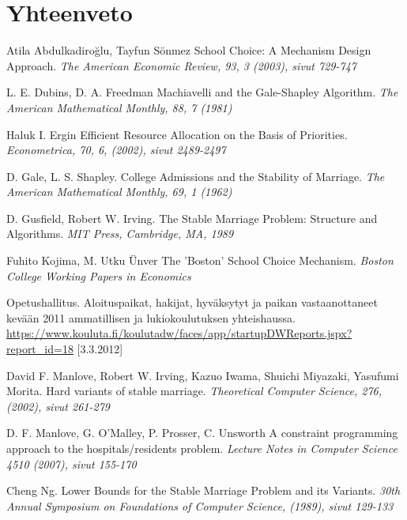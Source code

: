 \documentclass[gradu, twoside]{tktltiki}
\begin{document}
\section{Yhteenveto}

\newpage
\begin{thebibliography}{XXX99}

  Atila Abdulkadiroğlu, Tayfun Sönmez
  School Choice: A Mechanism Design Approach.
  \emph{The American Economic Review, 93, 3 (2003), sivut 729-747}

  L. E. Dubins, D. A. Freedman
  Machiavelli and the Gale-Shapley Algorithm.
  \emph{The American Mathematical Monthly, 88, 7 (1981)}

  Haluk I. Ergin
  Efficient Resource Allocation on the Basis of Priorities.
  \emph{Econometrica, 70, 6, (2002), sivut 2489-2497}

  D. Gale, L. S. Shapley.
  College Admissions and the Stability of Marriage.
  \emph{The American Mathematical Monthly, 69, 1 (1962)}

  D. Gusfield, Robert W. Irving.
  The Stable Marriage Problem: Structure and Algorithms.
  \emph{MIT Press, Cambridge, MA, 1989}

  Fuhito Kojima, M. Utku Ünver
  The 'Boston' School Choice Mechanism.
  \emph{Boston College Working Papers in Economics}

  Opetushallitus.
  Aloituspaikat, hakijat, hyväksytyt ja paikan vastaanottaneet
  kevään 2011 ammatillisen ja lukiokoulutuksen yhteishaussa.
  \url{https://www.kouluta.fi/koulutadw/faces/app/startupDWReports.jspx?report_id=18}
      [3.3.2012]

  David F. Manlove, Robert W. Irving, Kazuo Iwama, Shuichi Miyazaki,
  Yasufumi Morita.
  Hard variants of stable marriage.
  \emph{Theoretical Computer Science, 276, (2002), sivut 261-279}

  D. F. Manlove, G. O'Malley, P. Prosser, C. Unsworth
  A constraint programming approach to the hospitals/residents
  problem.
  \emph{Lecture Notes in Computer Science 4510 (2007), sivut 155-170}

  Cheng Ng.
  Lower Bounds for the Stable Marriage Problem and its Variants.
  \emph{30th Annual Symposium on Foundations of Computer Science,
    (1989), sivut 129-133}


\end{thebibliography}
\end{document}
